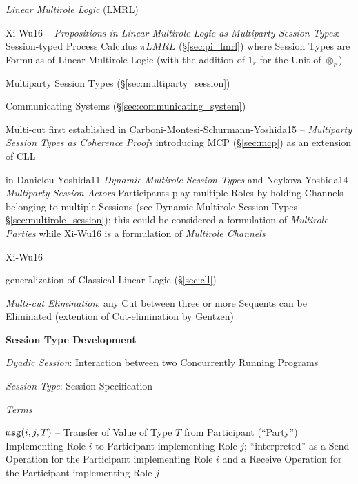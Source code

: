 \newcommand{\channelsend}{\mathtt{channel\_send}}
\newcommand{\channelrecv}{\mathtt{channel\_recv}}
\newcommand{\channelclose}{\mathtt{channel\_close}}
\newcommand{\channelskip}{\mathtt{channel\_skip}}

\newcommand{\Chan}{\mathsf{Chan}}
\newcommand{\Int}{\mathsf{Int}}
\renewcommand{\Unit}{\mathsf{()}}

\emph{Linear Multirole Logic} (LMRL)

Xi-Wu16 -- \emph{Propositions in Linear Multirole Logic as Multiparty
  Session Types}: Session-typed Process Calculus $\pi LMRL$
(\S\ref{sec:pi_lmrl}) where Session Types are Formulas of Linear
Multirole Logic (with the addition of $1_r$ for the Unit of
$\otimes_r$)

\fist Multiparty Session Types (\S\ref{sec:multiparty_session})

\fist Communicating Systems (\S\ref{sec:communicating_system})

Multi-cut first established in Carboni-Montesi-Schurmann-Yoshida15 --
\emph{Multiparty Session Types as Coherence Proofs} introducing MCP
(\S\ref{sec:mcp}) as an extension of CLL

\fist in Danielou-Yoshida11 \emph{Dynamic Multirole Session Types} and
Neykova-Yoshida14 \emph{Multiparty Session Actors} Participants play
multiple Roles by holding Channels belonging to multiple Sessions (see
Dynamic Multirole Session Types \S\ref{sec:multirole_session}); this
could be considered a formulation of \emph{Multirole Parties} while
Xi-Wu16 is a formulation of \emph{Multirole Channels}


\asterism

Xi-Wu16

generalization of Classical Linear Logic (\S\ref{sec:cll})

\emph{Multi-cut Elimination}: any Cut between three or more Sequents
can be Eliminated (extention of Cut-elimination by Gentzen)


\textbf{Session Type Development}

\emph{Dyadic Session}: Interaction between two Concurrently Running Programs

\emph{Session Type}: Session Specification

\emph{Terms}

$\mathtt{msg}(i,j,T)$ -- Transfer of Value of Type $T$ from Participant
(``Party'') Implementing Role $i$ to Participant implementing Role
$j$; ``interpreted'' as a Send Operation for the Participant
implementing Role $i$ and a Receive Operation for the Participant
implementing Role $j$

